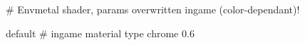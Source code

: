 # Envmetal shader, params overwritten ingame (color-dependant)!

default			 # ingame material type
chrome
0.6



